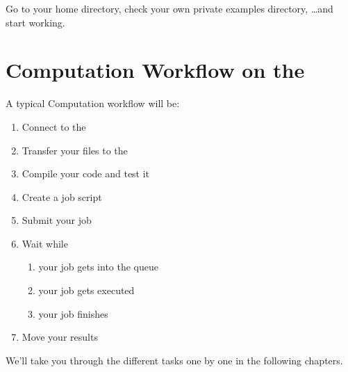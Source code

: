 \begin{prompt}
\end{prompt}

Go to your home directory, check your own private examples directory, \dots  and start working.


\section{Computation Workflow on the \hpc}
\label{sec:compuation-workflow-on-the-hpc}

A typical Computation workflow will be:

\begin{enumerate}
  \item  Connect to the \hpc
  \item  Transfer your files to the \hpc
  \item  Compile your code and test it
  \item  Create a job script
  \item  Submit your job
  \item  Wait while
  \begin{enumerate}
    \item  your job gets into the queue
    \item  your job gets executed
    \item  your job finishes
  \end{enumerate}
  \item  Move your results
\end{enumerate}

We'll take you through the different tasks one by one in the following
chapters.
